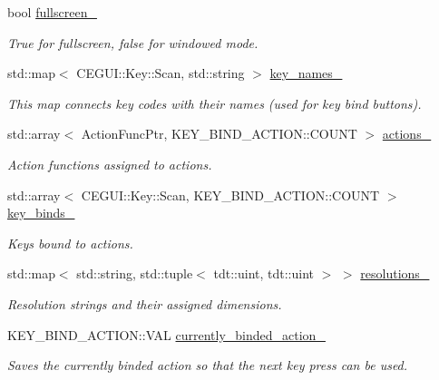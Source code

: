 \begin{DoxyCompactItemize}
\item 
bool \hyperlink{class_options_window_a536d5e2d5cc3f8c419836e1e5ff80423}{fullscreen\+\_\+}
\begin{DoxyCompactList}\small\item\em True for fullscreen, false for windowed mode. \end{DoxyCompactList}\item 
std\+::map$<$ C\+E\+G\+U\+I\+::\+Key\+::\+Scan, std\+::string $>$ \hyperlink{class_options_window_a65c8541c815655feaa458edb01738213}{key\+\_\+names\+\_\+}
\begin{DoxyCompactList}\small\item\em This map connects key codes with their names (used for key bind buttons). \end{DoxyCompactList}\item 
std\+::array$<$ Action\+Func\+Ptr, K\+E\+Y\+\_\+\+B\+I\+N\+D\+\_\+\+A\+C\+T\+I\+O\+N\+::\+C\+O\+U\+NT $>$ \hyperlink{class_options_window_a343bc2c957774fb3de4ba8ea8fbef3df}{actions\+\_\+}
\begin{DoxyCompactList}\small\item\em Action functions assigned to actions. \end{DoxyCompactList}\item 
std\+::array$<$ C\+E\+G\+U\+I\+::\+Key\+::\+Scan, K\+E\+Y\+\_\+\+B\+I\+N\+D\+\_\+\+A\+C\+T\+I\+O\+N\+::\+C\+O\+U\+NT $>$ \hyperlink{class_options_window_a1727e50166ba8b67f5f97f6213e0f80d}{key\+\_\+binds\+\_\+}
\begin{DoxyCompactList}\small\item\em Keys bound to actions. \end{DoxyCompactList}\item 
std\+::map$<$ std\+::string, std\+::tuple$<$ tdt\+::uint, tdt\+::uint $>$ $>$ \hyperlink{class_options_window_ae7e2ff101e41b90c0063b78710b85639}{resolutions\+\_\+}
\begin{DoxyCompactList}\small\item\em Resolution strings and their assigned dimensions. \end{DoxyCompactList}\item 
K\+E\+Y\+\_\+\+B\+I\+N\+D\+\_\+\+A\+C\+T\+I\+O\+N\+::\+V\+AL \hyperlink{class_options_window_a62f3d533394c12986766deb0e73794c2}{currently\+\_\+binded\+\_\+action\+\_\+}
\begin{DoxyCompactList}\small\item\em Saves the currently binded action so that the next key press can be used. \end{DoxyCompactList}\end{DoxyCompactItemize}
